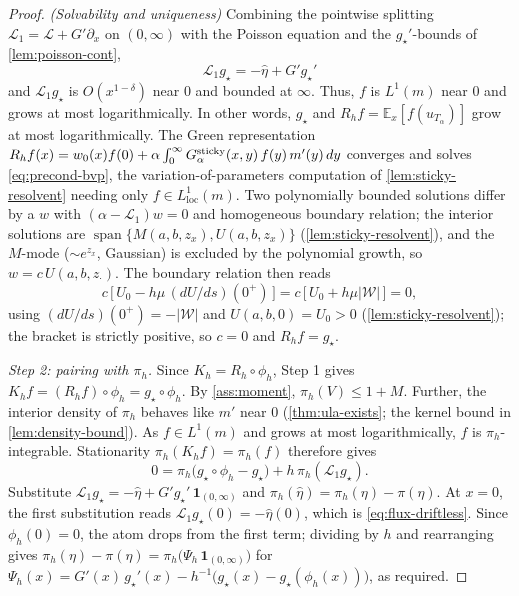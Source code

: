 \documentclass[aap,preprint]{imsart}
\numberwithin{equation}{section}
\theoremstyle{plain}
\theoremstyle{definition}
\begin{document}
\begin{proof}
  \emph{(Solvability and uniqueness)} Combining the pointwise splitting $\mathcal L_1=\mathcal L+G'\partial_x$ on $(0,\infty)$ with the Poisson equation and the $g_\star'$-bounds of \cref{lem:poisson-cont}, \begin{equation}
    \mathcal L_1g_\star=-\hat\eta+G'g_\star'\label{eq:l1gstar}
  \end{equation}
  and $\mathcal L_1g_\star$ is $O(x^{1-\delta})$ near $0$ and bounded at $\infty$. Thus, $f$ is $L^1(m)$ near $0$ and grows at most logarithmically. In other words, $g_\star$ and $R_hf=\mathbb E_x[f(u_{T_\alpha})]$ grow at most logarithmically.  The Green representation $R_hf(x)=w_0(x)f(0)+\alpha\int_0^\infty G^{\rm sticky}_\alpha(x,y)\,f(y)\,m'(y)\,dy$ converges and solves \cref{eq:precond-bvp}, the variation-of-parameters computation of \cref{lem:sticky-resolvent} needing only $f\in L^1_{\mathrm{loc}}(m)$.  Two polynomially bounded solutions differ by a $w$ with $(\alpha-\mathcal L_1)w=0$ and homogeneous boundary relation; the interior solutions are $\operatorname{span}\{M(a,b,z_x),U(a,b,z_x)\}$ (\cref{lem:sticky-resolvent}), and the $M$-mode ($\sim e^{z_x}$, Gaussian) is excluded by the polynomial growth, so $w=c\,U(a,b,z_\cdot)$.  The boundary relation then reads
  \[
    c\,\bigl[\,U_0-h\mu\,(dU/ds)(0^+)\,\bigr]=c\,\bigl[\,U_0+h\mu|\mathcal W|\,\bigr]=0,
  \]
  using $(dU/ds)(0^+)=-|\mathcal W|$ and $U(a,b,0)=U_0>0$ (\cref{lem:sticky-resolvent}); the bracket is strictly positive, so $c=0$ and $R_hf=g_\star$.

  \emph{Step 2: pairing with $\pi_h$.}  Since $K_h=R_h\circ\phi_h$, Step 1 gives $K_hf=(R_hf)\circ\phi_h=g_\star\circ\phi_h$. By \cref{ass:moment},  $\pi_h(V)\le1+M$. Further,  the interior density of $\pi_h$ behaves like $m'$ near $0$ (\cref{thm:ula-exists}; the kernel bound in \cref{lem:density-bound}). As $f\in L^1(m)$ and grows at most logarithmically,  $f$ is $\pi_h$-integrable. Stationarity $\pi_h(K_hf)=\pi_h(f)$ therefore gives
  \[
    0=\pi_h\bigl(g_\star\circ\phi_h-g_\star\bigr)+h\,\pi_h(\mathcal L_1g_\star).
  \]
  Substitute $\mathcal L_1g_\star=-\hat\eta+G'g_\star'\,\mathbf 1_{(0,\infty)}$ and $\pi_h(\hat\eta)=\pi_h(\eta)-\pi(\eta)$.  At $x=0$, the first substitution reads $\mathcal L_1g_\star(0)=-\hat\eta(0)$, which is \cref{eq:flux-driftless}.  Since $\phi_h(0)=0$, the atom drops from the first term; dividing by $h$ and rearranging gives
  $\pi_h(\eta)-\pi(\eta)=\pi_h\bigl(\Psi_h\,\mathbf 1_{(0,\infty)}\bigr)$ for $\Psi_h(x)=G'(x)\,g_\star'(x)-h^{-1}\bigl(g_\star(x)-g_\star(\phi_h(x))\bigr)$, as required.
\end{proof}
\end{document}
